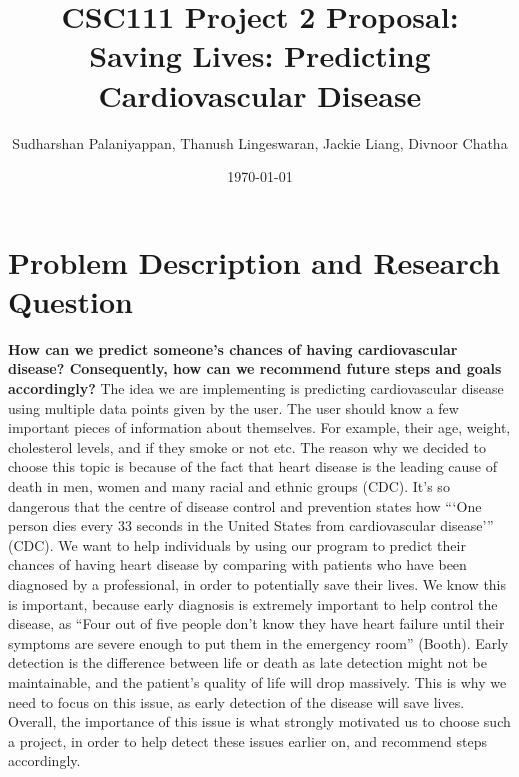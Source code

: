 \documentclass[fontsize=11pt]{article}
\title{CSC111 Project 2 Proposal: \\Saving Lives: Predicting Cardiovascular Disease}
\author{Sudharshan Palaniyappan, Thanush Lingeswaran, Jackie Liang, Divnoor Chatha}
\date{\today}
\begin{document}
\maketitle

\section*{Problem Description and Research Question}
\textbf{How can we predict someone’s chances of having cardiovascular disease? Consequently, how can we recommend future steps and goals accordingly?} The idea we are implementing is predicting cardiovascular disease using multiple data points given by the user. The user should know a few important pieces of information about themselves. For example, their age, weight, cholesterol levels, and if they smoke or not etc. The reason why we decided to choose this topic is because of the fact that heart disease is the leading cause of death in men, women and many racial and ethnic groups (CDC). It's so dangerous that the centre of disease control and prevention states how “‘One person dies every 33 seconds in the United States from cardiovascular disease’” (CDC). We want to help individuals by using our program to predict their chances of having heart disease by comparing with patients who have been diagnosed by a professional, in order to potentially save their lives. We know this is important, because early diagnosis is extremely important to help control the disease, as “Four out of five people don’t know they have heart failure until their symptoms are severe enough to put them in the emergency room” (Booth). Early detection is the difference between life or death as late detection might not be maintainable, and the patient's quality of life will drop massively. This is why we need to focus on this issue, as early detection of the disease will save lives. Overall, the importance of this issue is what strongly motivated us to choose such a project, in order to help detect these issues earlier on, and recommend steps accordingly. 
\end{document}
